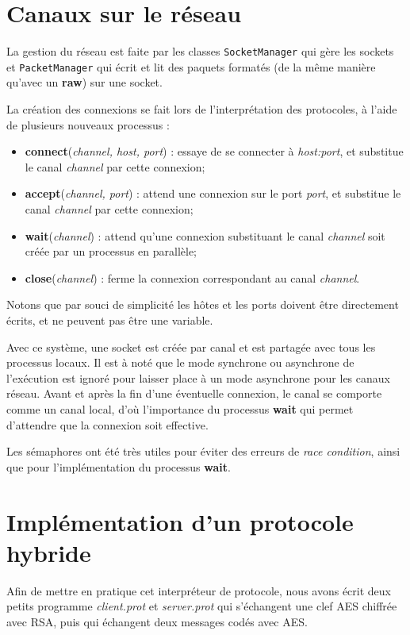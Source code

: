 \documentclass[11pt]{article} %
\begin{document}
\section{Canaux sur le réseau}

La gestion du réseau est faite par les classes \texttt{SocketManager} qui gère les sockets et \texttt{PacketManager} qui écrit et lit des paquets formatés (de la même manière qu'avec un \textbf{raw}) sur une socket.

La création des connexions se fait lors de l'interprétation des protocoles, à l'aide de plusieurs nouveaux processus :
\begin{itemize}
  \item \textbf{connect}(\emph{channel, host, port}) : essaye de se connecter à \emph{host:port}, et substitue le canal \emph{channel} par cette connexion;
  \item \textbf{accept}(\emph{channel, port}) : attend une connexion sur le port \emph{port}, et substitue le canal \emph{channel} par cette connexion;
  \item \textbf{wait}(\emph{channel}) : attend qu'une connexion substituant le canal \emph{channel} soit créée par un processus en parallèle;
  \item \textbf{close}(\emph{channel}) : ferme la connexion correspondant au canal \emph{channel}.
\end{itemize}

Notons que par souci de simplicité les hôtes et les ports doivent être directement écrits, et ne peuvent pas être une variable.

Avec ce système, une socket est créée par canal et est partagée avec tous les processus locaux. Il est à noté que le mode synchrone ou asynchrone de l’exécution est ignoré pour laisser place à un mode asynchrone pour les canaux réseau. Avant et après la fin d'une éventuelle connexion, le canal se comporte comme un canal local, d'où l'importance du processus \textbf{wait} qui permet d'attendre que la connexion soit effective.

Les sémaphores ont été très utiles pour éviter des erreurs de \emph{race condition}, ainsi que pour l'implémentation du processus \textbf{wait}.

\section{Implémentation d'un protocole hybride}

Afin de mettre en pratique cet interpréteur de protocole, nous avons écrit deux petits programme \emph{client.prot} et \emph{server.prot} qui s'échangent une clef AES chiffrée avec RSA, puis qui échangent deux messages codés avec AES.
\end{document}
